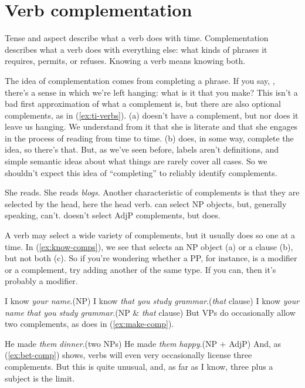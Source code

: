 \section{Verb complementation}\label{sec:verb-complementation}

Tense and aspect describe what a verb does with time. Complementation describes what a verb does with everything else: what kinds of phrases it requires, permits, or refuses. Knowing a verb means knowing both.

The idea of complementation comes from completing a phrase. If you say, , there's a sense in which we're left hanging: what is it that you make? This isn't a bad first approximation of what a complement is, but there are also optional complements, as in (\ref{ex:ti-verbs}). (a) doesn't have a complement, but nor does it leave us hanging. We understand from it that she is literate and that she engages in the process of reading from time to time. (b) does, in some way, complete the idea, so there's that. But, as we've seen before, labels aren't definitions, and simple semantic ideas about what things are rarely cover all cases. So we shouldn't expect this idea of \enquote{completing} to reliably identify complements.

\ea\label{ex:ti-verbs}
\ea She reads.
\ex She reads \emph{blogs}.
\z\z
Another characteristic of complements is that they are selected by the head, here the head verb.  can select NP objects, but, generally speaking,  can't.  doesn't select AdjP complements, but  does.

A verb may select a wide variety of complements, but it usually does so one at a time. In (\ref{ex:know-comps}), we see that  selects an NP object (a) or a  clause (b), but not both (c). So if you're wondering whether a PP, for instance, is a modifier or a complement, try adding another of the same type. If you can, then it's probably a modifier.

\ea\label{ex:know-comps}
\ea I know \emph{your name}.\hfill(NP)
\ex I know \emph{that you study grammar}.\hfill(\emph{that} clause)
\ex *I know \emph{your name} \emph{that you study grammar}.\hfill(NP \& \emph{that} clause)
\z\z
But VPs do occasionally allow two complements, as  does in (\ref{ex:make-comp}).

\ea\label{ex:make-comp}
\ea He made \emph{them} \emph{dinner}.\hfill(two NPs)
\ex He made \emph{them} \emph{happy}.\hfill(NP + AdjP)
\z\z
\noindent And, as (\ref{ex:bet-comp}) shows, verbs will even very occasionally license three complements. But this is quite unusual, and, as far as I know, three plus a subject is the limit.

